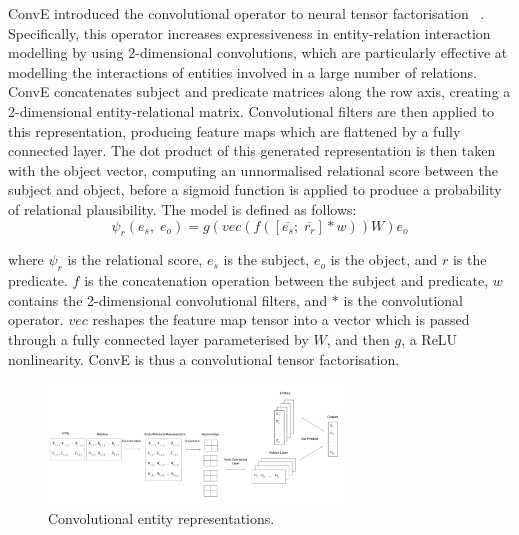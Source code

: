 ConvE introduced the convolutional operator to neural tensor factorisation \unskip ~\citep{dettmers2018convolutional}. Specifically, this operator increases expressiveness in entity-relation interaction modelling by using 2-dimensional convolutions, which are particularly effective at modelling the interactions of entities involved in a large number of relations. ConvE concatenates subject and predicate matrices along the row axis, creating a 2-dimensional entity-relational matrix. Convolutional filters are then applied to this representation, producing feature maps which are flattened by a fully connected layer. The dot product of this generated representation is then taken with the object vector, computing an unnormalised relational score between the subject and object, before a sigmoid function is applied to produce a probability of relational plausibility. The model is defined as follows:
\begin{equation}
	\psi_r(e_s, \; e_o) = g(vec(f(\left [ \overline{e_s}; \; \overline{r_r} \right ]*w))W)e_o
\end{equation}

\noindent where $ \psi_r $ is the relational score, $ e_s $ is the subject, $ e_o $ is the object, and $ r $ is the predicate. $ f $ is the concatenation operation between the subject and predicate, $ w $ contains the 2-dimensional convolutional filters, and $ * $ is the convolutional operator. $ vec $ reshapes the feature map tensor into a vector which is passed through a fully connected layer parameterised by $ W $, and then $ g $, a ReLU nonlinearity. ConvE is thus a convolutional tensor factorisation. 

\begin{figure}[H]
   	\centering
    	\includegraphics[width=0.7\textwidth, height=0.4\textwidth]{convolutional_entity_representations_final}
	\caption{Convolutional entity representations.}
\end{figure}

\newpage

